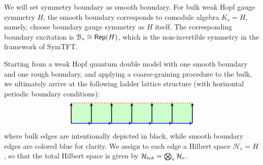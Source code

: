 \documentclass[a4paper,11pt]{article}
\theoremstyle{theorem}
\theoremstyle{remark}
\newcommand\eB           {\EuScript{B}}
\newcommand{\Rep}{\mathsf{Rep}}
\begin{document}
We will set symmetry boundary as smooth boundary.
For bulk weak Hopf gauge symmetry $H$, the smooth boundary corresponds to comodule algebra $K_s=H$, namely, choose boundary gauge symmetry as $H$ itself. The corresponding boundary excitation is $\eB_s\cong \Rep(H)$, which is the non-invertible symmetry in the framework of SymTFT.



 

Starting from a weak Hopf quantum double model with one smooth boundary and one rough boundary, and applying a coarse-graining procedure to the bulk, we ultimately arrive at the following ladder lattice structure (with horizontal periodic boundary conditions):
\begin{equation}\label{eq:ClusterLattice}
\begin{aligned}
\begin{tikzpicture}
    \def\n{5}
    \def\s{1}
    \fill[green!20] (0, 0) rectangle (\n*\s+\s, \s); %
    \foreach \i in {0,...,\n} {
        \draw[-stealth, line width=1.0pt,blue, midway] (\i*\s, 0) -- (\i*\s+\s, 0);
        \draw[dotted, line width=1.0pt,red, midway] (\i*\s, \s) -- (\i*\s+\s, \s);
        \draw[-stealth,line width=1.0pt, midway] (\i*\s, 0) -- (\i*\s, \s);
    }
    \draw[-stealth, midway,line width=1.0pt] (\n*\s+\s, 0) -- (\n*\s+\s, \s);
\end{tikzpicture}
\end{aligned}
\end{equation}
where bulk edges are intentionally depicted in black, while smooth boundary edges are colored blue for clarity.
We assign to each edge a Hilbert space $\mathcal{H}_e = H$, so that the total Hilbert space is given by $\mathcal{H}_{\rm tot} = \bigotimes_{e} \mathcal{H}_e$. 
\end{document}
